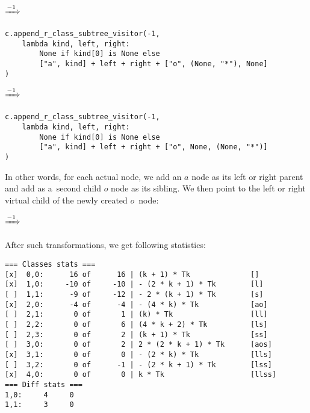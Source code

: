 \documentclass[final]{article}
\theoremstyle{definition}
\theoremstyle{definition}
\theoremstyle{remark}
\newcommand{\includeinlinesvg}[2]{\begin{minipage}{#1\textwidth}\end{minipage}}
\newcommand{\includeinlinescaledsvg}[3]{\begin{minipage}{#1\textwidth}\begin{center}\end{center}\end{minipage}}
\begin{document}
\begin{center}
    \includeinlinescaledsvg{.4}{.7}{lambda__transformations__010a}%
    \(\xRightarrow{-1}\)%
    \includeinlinescaledsvg{.4}{.7}{lambda__transformations__010b}%
\end{center}

\begin{lstlisting}
c.append_r_class_subtree_visitor(-1,
    lambda kind, left, right:
        None if kind[0] is None else
        ["a", kind] + left + right + ["o", (None, "*"), None]
)
\end{lstlisting}

\begin{center}
    \includeinlinescaledsvg{.4}{.7}{lambda__transformations__011a}%
    \(\xRightarrow{-1}\)%
    \includeinlinescaledsvg{.4}{.7}{lambda__transformations__011b}%
\end{center}

\begin{lstlisting}
c.append_r_class_subtree_visitor(-1,
    lambda kind, left, right:
        None if kind[0] is None else
        ["a", kind] + left + right + ["o", None, (None, "*")]
)
\end{lstlisting}

In other words, for each actual node, we add an \(a\) node as its left or right parent and add as a~second child \(o\) node as its sibling. We then point to the left or right virtual child of the newly created \(o\)~node:

\includeinlinesvg{.20}{lambda__trees_200__0_base}%
\(\xRightarrow{-1}\)%
\includeinlinesvg{.20}{lambda__trees_200__0}%
\includeinlinesvg{.20}{lambda__trees_201__0}%
\includeinlinesvg{.20}{lambda__trees_202__0}%
\includeinlinesvg{.20}{lambda__trees_203__0}%

After such transformations, we get following statistics:

\begin{lstlisting}
=== Classes stats ===
[x]  0,0:      16 of      16 | (k + 1) * Tk              []
[x]  1,0:     -10 of     -10 | - (2 * k + 1) * Tk        [l]
[ ]  1,1:      -9 of     -12 | - 2 * (k + 1) * Tk        [s]
[x]  2,0:      -4 of      -4 | - (4 * k) * Tk            [ao]
[ ]  2,1:       0 of       1 | (k) * Tk                  [ll]
[ ]  2,2:       0 of       6 | (4 * k + 2) * Tk          [ls]
[ ]  2,3:       0 of       2 | (k + 1) * Tk              [ss]
[ ]  3,0:       0 of       2 | 2 * (2 * k + 1) * Tk      [aos]
[x]  3,1:       0 of       0 | - (2 * k) * Tk            [lls]
[ ]  3,2:       0 of      -1 | - (2 * k + 1) * Tk        [lss]
[x]  4,0:       0 of       0 | k * Tk                    [llss]
=== Diff stats ===
1,0:     4     0
1,1:     3     0
\end{lstlisting}
\end{document}

